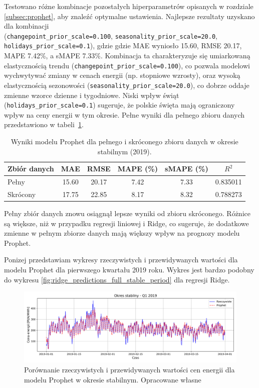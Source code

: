 Testowano różne kombinacje pozostałych hiperparametrów opisanych w rozdziale \ref{subsec:prophet}, aby znaleźć optymalne ustawienia. Najlepsze rezultaty uzyskano dla kombinacji\\ (\texttt{changepoint\_prior\_scale=0.100}, \texttt{seasonality\_prior\_scale=20.0}, \texttt{holidays\_prior\_scale=0.1}), gdzie gdzie MAE wyniosło 15.60, RMSE 20.17, MAPE 7.42\%, a sMAPE 7.33\%. Kombinacja ta charakteryzuje się umiarkowaną elastycznością trendu (\texttt{changepoint\_prior\_scale=0.100}), co pozwala modelowi wychwytywać zmiany w cenach energii (np. stopniowe wzrosty), oraz wysoką elastycznością sezonowości (\texttt{seasonality\_prior\_scale=20.0}), co dobrze oddaje zmienne wzorce dzienne i tygodniowe. Niski wpływ świąt (\texttt{holidays\_prior\_scale=0.1}) sugeruje, że polskie święta mają ograniczony wpływ na ceny energii w tym okresie. Pełne wyniki dla pełnego zbioru danych przedstawiono w tabeli~\ref{tab:prophet_results_combined_stable}.

\begin{table}[H]
    \centering
    \caption{Wyniki modelu Prophet dla pełnego i skróconego zbioru danych w okresie stabilnym (2019).}
    \label{tab:prophet_results_combined_stable}
    \begin{tabular}{|l|ccccc|}
        \hline
        \textbf{Zbiór danych} & \textbf{MAE} & \textbf{RMSE} & \textbf{MAPE (\%)} & \textbf{sMAPE (\%)} & \textbf{\(R^2\)} \\
        \hline
        Pełny     & 15.60 & 20.17 & 7.42 & 7.33 & 0.835011 \\
        Skrócony  & 17.75 & 22.85 & 8.17 & 8.32 & 0.788273 \\
        \hline
    \end{tabular}
\end{table}

Pełny zbiór danych znowu osiągnął lepsze wyniki od zbioru skróconego. Różnice są większe, niż w przypadku regresji liniowej i Ridge, co sugeruje, że dodatkowe zmienne w pełnym zbiorze danych mają większy wpływ na prognozy modelu Prophet.

Ponizej przedstawiam wykresy rzeczywistych i przewidywanych wartości dla modelu Prophet dla pierwszego kwartału 2019 roku. Wykres jest bardzo podobny do wykresu \ref{fig:ridge_predictions_full_stable_period} dla regresji Ridge.

\begin{figure}[H]
    \centering
    \includegraphics[width=1.0\textwidth]{../../plots/predicts/Prophet_predictions_stable_Q1.png}
    \caption{Porównanie rzeczywistych i przewidywanych wartości cen energii dla modelu Prophet w okresie stabilnym. Opracowane własne}
    \label{fig:prophet_predictions_stable_period}
\end{figure}

